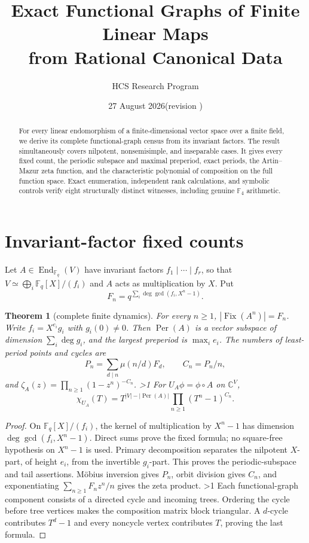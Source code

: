 \documentclass[11pt]{article}
\title{Exact Functional Graphs of Finite Linear Maps\\
from Rational Canonical Data}
\author{HCS Research Program}
\date{27 August 2026\quad (revision \CRevisionRound)}
\newtheorem{theorem}{Theorem}
\newcommand{\F}{\mathbb F}
\newcommand{\Fix}{\operatorname{Fix}}
\newcommand{\Per}{\operatorname{Per}}
\begin{document}
\maketitle
\begin{abstract}
For every linear endomorphism of a finite-dimensional vector space over a
finite field, we derive its complete functional-graph census from its invariant
factors.  The result simultaneously covers nilpotent, nonsemisimple, and
inseparable cases.  It gives every fixed count, the periodic subspace and
maximal preperiod, exact periods, the Artin--Mazur zeta function, and the
characteristic polynomial of composition on the full function space.  Exact
enumeration, independent rank calculations, and symbolic controls verify eight
structurally distinct witnesses, including genuine $\F_4$ arithmetic.
\end{abstract}

\section{Invariant-factor fixed counts}
Let $A\in\operatorname{End}_{\F_q}(V)$ have invariant factors
$f_1\mid\cdots\mid f_r$, so that $V\simeq\bigoplus_i\F_q[X]/(f_i)$ and $A$
acts as multiplication by $X$.  Put
\[
 F_n=q^{\sum_i\deg\gcd(f_i,X^n-1)}.
\]

\begin{theorem}[complete finite dynamics]\label{thm:main}
For every $n\ge1$, $|\Fix(A^n)|=F_n$.  Write
$f_i=X^{e_i}g_i$ with $g_i(0)\ne0$.  Then $\Per(A)$ is a vector subspace of
dimension $\sum_i\deg g_i$, and the largest preperiod is $\max_i e_i$.
The numbers of least-period points and cycles are
\[
 P_n=\sum_{d\mid n}\mu(n/d)F_d,\qquad C_n=P_n/n,
\]
and
$\zeta_A(z)=\prod_{n\ge1}(1-z^n)^{-C_n}$.
\ifnum\CRevisionRound>1
For $U_A\phi=\phi\circ A$ on $\mathbb C^V$,
\[
 \chi_{U_A}(T)=T^{|V|-|\Per(A)|}
                 \prod_{n\ge1}(T^n-1)^{C_n}.
\]
\fi
\end{theorem}

\begin{proof}
On $\F_q[X]/(f_i)$, the kernel of multiplication by $X^n-1$ has dimension
$\deg\gcd(f_i,X^n-1)$.  Direct sums prove the fixed formula; no square-free
hypothesis on $X^n-1$ is used.  Primary decomposition separates the nilpotent
$X$-part, of height $e_i$, from the invertible $g_i$-part.  This proves the
periodic-subspace and tail assertions.  M\"obius inversion gives $P_n$, orbit
division gives $C_n$, and exponentiating
$\sum_{n\ge1}F_nz^n/n$ gives the zeta product.
\ifnum\CRevisionRound>1
Each functional-graph component consists of a directed cycle and incoming
trees.  Ordering the cycle before tree vertices makes the composition matrix
block triangular.  A $d$-cycle contributes $T^d-1$ and every noncycle vertex
contributes $T$, proving the last formula.
\fi
\end{proof}
\end{document}
